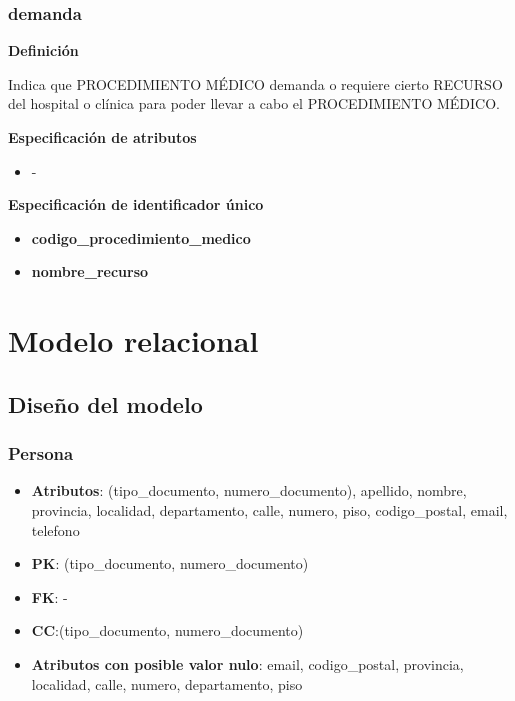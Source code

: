 \documentclass[a4paper,11pt]{article}
\begin{document}
\subsubsection{\textbf{demanda}}

\textbf{Definición}

Indica que PROCEDIMIENTO MÉDICO demanda o requiere cierto RECURSO del hospital o clínica
para poder llevar a cabo el PROCEDIMIENTO MÉDICO.

\textbf{Especificación de atributos}

\begin{itemize}
     
    \item -

\end{itemize}

\textbf{Especificación de identificador único}

\begin{itemize}

    \item \textbf{codigo\_procedimiento\_medico}
   
    \item \textbf{nombre\_recurso} 

\end{itemize}

\newpage

\section{\textbf{Modelo relacional\label{HToc293405831}}}

\subsection{\textbf{Diseño del modelo\label{HToc293405832}}}

\subsubsection{\textbf{Persona}}

\begin{itemize}

\item 
\textbf{Atributos}: (tipo\_documento, numero\_documento), apellido, nombre, provincia, localidad, departamento, calle, numero, piso, codigo\_postal, email, telefono

\item 
\textbf{PK}: (tipo\_documento, numero\_documento)

\item
\textbf{FK}: -

\item 
\textbf{CC}:(tipo\_documento, numero\_documento)

\item 
\textbf{Atributos con posible valor nulo}: email, codigo\_postal, provincia, localidad, calle, numero, departamento, piso	
\end{itemize}
\end{document}
